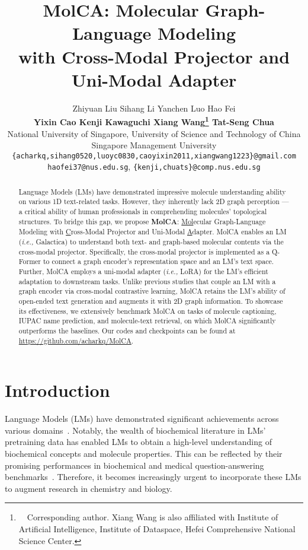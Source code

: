 \documentclass[11pt]{article}
\title{MolCA: Molecular Graph-Language Modeling\\ with Cross-Modal Projector and Uni-Modal Adapter}
\author{Zhiyuan Liu \quad Sihang Li \quad Yanchen Luo  \quad Hao Fei \\ \textbf{Yixin Cao \quad Kenji Kawaguchi \quad Xiang Wang\thanks{~~Corresponding author. Xiang Wang is also affiliated with Institute of Artificial Intelligence, Institute of Dataspace, Hefei Comprehensive National Science Center.} \quad Tat-Seng Chua} \\
National University of Singapore, University of Science and Technology of China\\
Singapore Management University\\
\texttt{\{acharkq,sihang0520,luoyc0830,caoyixin2011,xiangwang1223\}@gmail.com} \\ \texttt{haofei37@nus.edu.sg}, \texttt{\{kenji,chuats\}@comp.nus.edu.sg}\\}
\newcommand{\ie}{\emph{i.e., }}
\begin{document}
\maketitle








\begin{abstract}
    Language Models (LMs) have demonstrated impressive molecule understanding ability on various 1D text-related tasks. However, they inherently lack 2D graph perception — a critical ability of human professionals in comprehending molecules' topological structures. To bridge this gap, we propose \textbf{MolCA}: \underline{Mol}ecular Graph-Language Modeling with \underline{C}ross-Modal Projector and Uni-Modal \underline{A}dapter. MolCA enables an LM (\ie Galactica) to understand both text- and graph-based molecular contents via the cross-modal projector. Specifically, the cross-modal projector is implemented as a Q-Former to connect a graph encoder's representation space and an LM's text space. Further, MolCA employs a uni-modal adapter (\ie LoRA) for the LM's efficient adaptation to downstream tasks. Unlike previous studies that couple an LM with a graph encoder via cross-modal contrastive learning, MolCA retains the LM's ability of open-ended text generation and augments it with 2D graph information. To showcase its effectiveness, we extensively benchmark MolCA on tasks of molecule captioning, IUPAC name prediction, and molecule-text retrieval, on which MolCA significantly outperforms the baselines. Our codes and checkpoints can be found at \url{https://github.com/acharkq/MolCA}.
\end{abstract} 
\section{Introduction}
Language Models (LMs) have demonstrated significant achievements across various domains~\citep{BERT, LLMSurvey}. Notably, the wealth of biochemical literature in LMs' pretraining data has enabled LMs to obtain a high-level understanding of biochemical concepts and molecule properties. This can be reflected by their promising performances in biochemical and medical question-answering benchmarks~\citep{Galactica,GPT4}. Therefore, it becomes increasingly urgent to incorporate these LMs to augment research in chemistry and biology.
\end{document}
